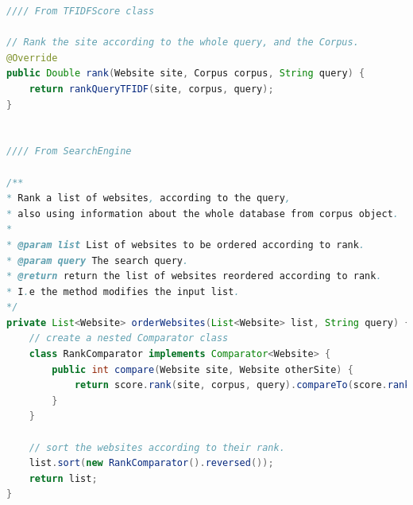 \begin{lstlisting}[language={Java}, caption={This is a code example.}, label={lst:scoreInterface}]
//// From TFIDFScore class 

// Rank the site according to the whole query, and the Corpus.
@Override
public Double rank(Website site, Corpus corpus, String query) {
	return rankQueryTFIDF(site, corpus, query);
}


//// From SearchEngine 

/**
* Rank a list of websites, according to the query, 
* also using information about the whole database from corpus object. 
*
* @param list List of websites to be ordered according to rank.
* @param query The search query.
* @return return the list of websites reordered according to rank.
* I.e the method modifies the input list.  
*/
private List<Website> orderWebsites(List<Website> list, String query) {
	// create a nested Comparator class
	class RankComparator implements Comparator<Website> {
		public int compare(Website site, Website otherSite) {
			return score.rank(site, corpus, query).compareTo(score.rank(otherSite, corpus, query));
		}
	}

	// sort the websites according to their rank.
	list.sort(new RankComparator().reversed());     
	return list;
}
\end{lstlisting}



